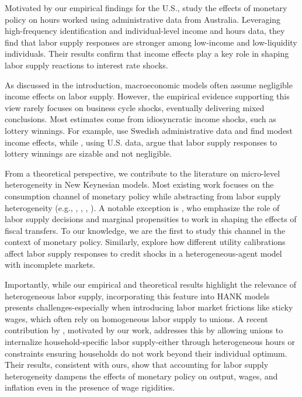 \documentclass[a4paper,12pt]{article}%
\begin{document}
Motivated by our empirical findings for the U.S., \citet{DHHS:25} study the effects of monetary policy on hours worked using administrative data from Australia. Leveraging high-frequency identification and individual-level income and hours data, they find that labor supply responses are stronger among low-income and low-liquidity individuals. Their results confirm that income effects play a key role in shaping labor supply reactions to interest rate shocks. %

As discussed in the introduction, macroeconomic models often assume negligible income effects on labor supply. However, the empirical evidence supporting this view rarely focuses on business cycle shocks, eventually delivering mixed conclusions. Most estimates come from idiosyncratic income shocks, such as lottery winnings. For example, \citet{CLNO17} use Swedish administrative data and find modest income effects, while \citet{Golosov:21}, using U.S. data, argue that labor supply responses to lottery winnings are sizable and not negligible.



From a theoretical perspective, we contribute to the literature on micro-level heterogeneity in New Keynesian models. Most existing work focuses on the consumption channel of monetary policy while abstracting from labor supply heterogeneity (e.g., \cite{Auclert:19}, \cite{IKC}, \cite{BBL24}, \cite{Bilbiie:2020}). A notable exception is \cite{AKO17}, who emphasize the role of labor supply decisions and marginal propensities to work in shaping the effects of fiscal transfers. To our knowledge, we are the first to study this channel in the context of monetary policy. Similarly, \cite{GL:2017} explore how different utility calibrations affect labor supply responses to credit shocks in a heterogeneous-agent model with incomplete markets.

Importantly, while our empirical and theoretical results highlight the relevance of heterogeneous labor supply, incorporating this feature into HANK models presents challenges-especially when introducing labor market frictions like sticky wages, which often rely on homogeneous labor supply to unions. A recent contribution by \citet{Gerkeetal24}, motivated by our work, addresses this by allowing unions to internalize household-specific labor supply-either through heterogeneous hours or constraints ensuring households do not work beyond their individual optimum. Their results, consistent with ours, show that accounting for labor supply heterogeneity dampens the effects of monetary policy on output, wages, and inflation even in the presence of wage rigidities.
\end{document}
